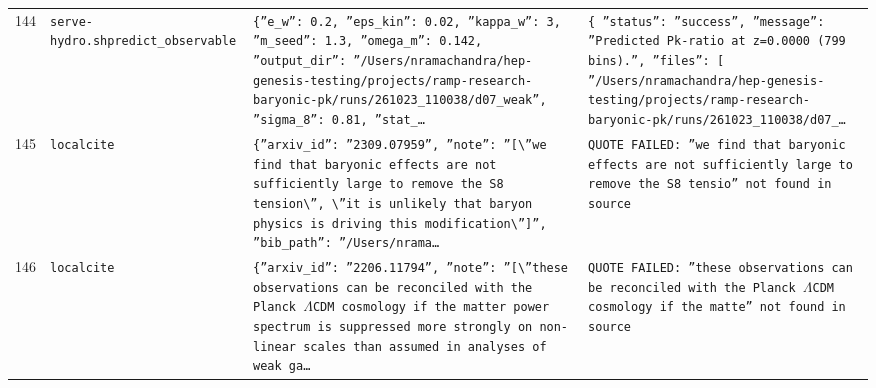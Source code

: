 \documentclass[11pt,a4paper]{article}
\begin{document}
\begin{longtable}{@{}p{}p{}p{}p{}@{}}
144 & \texttt{serve-hydro.sh}\newline\texttt{predict\_\allowbreak{}observable} & \texttt{\{''e\_\allowbreak{}w'':\allowbreak{} 0.2,\allowbreak{} ''eps\_\allowbreak{}kin'':\allowbreak{} 0.02,\allowbreak{} ''kappa\_\allowbreak{}w'':\allowbreak{} 3,\allowbreak{} ''m\_\allowbreak{}seed'':\allowbreak{} 1.3,\allowbreak{} ''omega\_\allowbreak{}m'':\allowbreak{} 0.142,\allowbreak{} ''output\_\allowbreak{}dir'':\allowbreak{} ''/\allowbreak{}Users/\allowbreak{}nramachandra/\allowbreak{}hep-genesis-testing/\allowbreak{}projects/\allowbreak{}ramp-research-baryonic-pk/\allowbreak{}runs/\allowbreak{}261023\_\allowbreak{}110038/\allowbreak{}d07\_\allowbreak{}weak'',\allowbreak{} ''sigma\_\allowbreak{}8'':\allowbreak{} 0.81,\allowbreak{} ''stat\_\allowbreak{}\ldots{}\allowbreak{}} & \texttt{\{   ''status'':\allowbreak{} ''success'',\allowbreak{}   ''message'':\allowbreak{} ''Predicted Pk-ratio at z=\allowbreak{}0.0000 (799 bins)\allowbreak{}.'',\allowbreak{}   ''files'':\allowbreak{} [     ''/\allowbreak{}Users/\allowbreak{}nramachandra/\allowbreak{}hep-genesis-testing/\allowbreak{}projects/\allowbreak{}ramp-research-baryonic-pk/\allowbreak{}runs/\allowbreak{}261023\_\allowbreak{}110038/\allowbreak{}d07\_\allowbreak{}\ldots{}\allowbreak{}} \\
145 & \texttt{local}\newline\texttt{cite} & \texttt{\{''arxiv\_\allowbreak{}id'':\allowbreak{} ''2309.07959'',\allowbreak{} ''note'':\allowbreak{} ''[\textbackslash{}\allowbreak{}''we find that baryonic effects are not sufficiently large to remove the S8 tension\textbackslash{}\allowbreak{}'',\allowbreak{} \textbackslash{}\allowbreak{}''it is unlikely that baryon physics is driving this modification\textbackslash{}\allowbreak{}'']\allowbreak{}'',\allowbreak{} ''bib\_\allowbreak{}path'':\allowbreak{} ''/\allowbreak{}Users/\allowbreak{}nrama\ldots{}\allowbreak{}} & \texttt{QUOTE FAILED:\allowbreak{} ''we find that baryonic effects are not sufficiently large to remove the S8 tensio'' not found in source} \\
146 & \texttt{local}\newline\texttt{cite} & \texttt{\{''arxiv\_\allowbreak{}id'':\allowbreak{} ''2206.11794'',\allowbreak{} ''note'':\allowbreak{} ''[\textbackslash{}\allowbreak{}''these observations can be reconciled with the Planck $\Lambda$CDM cosmology if the matter power spectrum is suppressed more strongly on non-linear scales than assumed in analyses of weak ga\ldots{}\allowbreak{}} & \texttt{QUOTE FAILED:\allowbreak{} ''these observations can be reconciled with the Planck $\Lambda$CDM cosmology if the matte'' not found in source} \\

\end{longtable}
\end{document}
